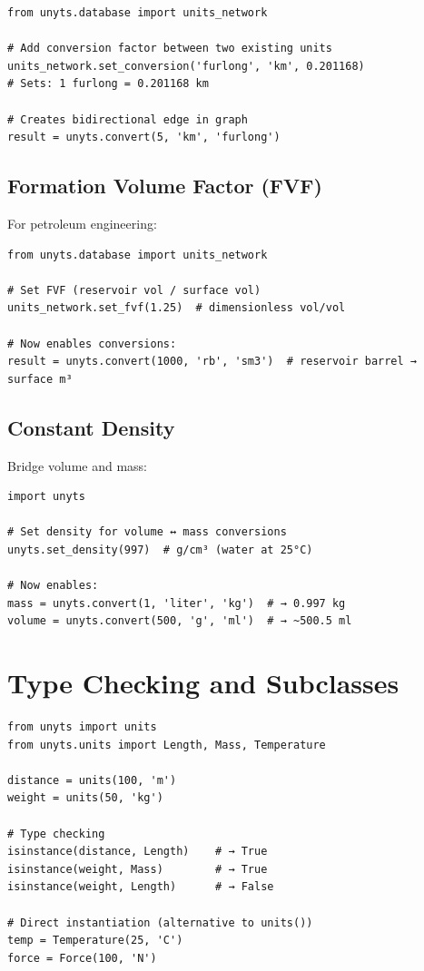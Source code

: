 \documentclass[11pt,a4paper]{report}
\begin{document}
\begin{lstlisting}[style=pythonstyle]
from unyts.database import units_network

# Add conversion factor between two existing units
units_network.set_conversion('furlong', 'km', 0.201168)
# Sets: 1 furlong = 0.201168 km

# Creates bidirectional edge in graph
result = unyts.convert(5, 'km', 'furlong')
\end{lstlisting}

\subsection{Formation Volume Factor (FVF)}

For petroleum engineering:

\begin{lstlisting}[style=pythonstyle]
from unyts.database import units_network

# Set FVF (reservoir vol / surface vol)
units_network.set_fvf(1.25)  # dimensionless vol/vol

# Now enables conversions:
result = unyts.convert(1000, 'rb', 'sm3')  # reservoir barrel → surface m³
\end{lstlisting}

\subsection{Constant Density}

Bridge volume and mass:

\begin{lstlisting}[style=pythonstyle]
import unyts

# Set density for volume ↔ mass conversions
unyts.set_density(997)  # g/cm³ (water at 25°C)

# Now enables:
mass = unyts.convert(1, 'liter', 'kg')  # → 0.997 kg
volume = unyts.convert(500, 'g', 'ml')  # → ~500.5 ml
\end{lstlisting}

\section{Type Checking and Subclasses}

\begin{lstlisting}[style=pythonstyle]
from unyts import units
from unyts.units import Length, Mass, Temperature

distance = units(100, 'm')
weight = units(50, 'kg')

# Type checking
isinstance(distance, Length)    # → True
isinstance(weight, Mass)        # → True
isinstance(weight, Length)      # → False

# Direct instantiation (alternative to units())
temp = Temperature(25, 'C')
force = Force(100, 'N')
\end{lstlisting}
\end{document}
